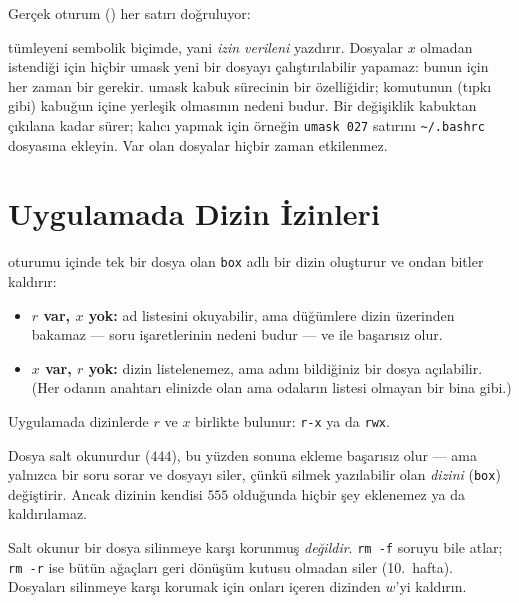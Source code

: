 Gerçek oturum () her satırı doğruluyor:



 tümleyeni sembolik biçimde, yani \emph{izin verileni} yazdırır. Dosyalar $x$ olmadan istendiği için hiçbir umask yeni bir dosyayı çalıştırılabilir yapamaz: bunun için her zaman bir  gerekir. umask kabuk sürecinin bir özelliğidir;  komutunun (tıpkı  gibi) kabuğun içine yerleşik olmasının nedeni budur. Bir değişiklik kabuktan çıkılana kadar sürer; kalıcı yapmak için örneğin \texttt{umask 027} satırını \texttt{\textasciitilde/.bashrc} dosyasına ekleyin. Var olan dosyalar hiçbir zaman etkilenmez.

\section{Uygulamada Dizin İzinleri}
\label{sec:dirs}

 oturumu içinde tek bir dosya olan \texttt{box} adlı bir dizin oluşturur ve ondan bitler kaldırır:



\begin{itemize}
  \item \textbf{$r$ var, $x$ yok:}  ad listesini okuyabilir, ama  düğümlere dizin üzerinden bakamaz --- soru işaretlerinin nedeni budur --- ve  ile  başarısız olur.
  \item \textbf{$x$ var, $r$ yok:} dizin listelenemez, ama adını bildiğiniz bir dosya açılabilir. (Her odanın anahtarı elinizde olan ama odaların listesi olmayan bir bina gibi.)
\end{itemize}
Uygulamada dizinlerde $r$ ve $x$ birlikte bulunur: \texttt{r-x} ya da \texttt{rwx}.



Dosya salt okunurdur ($444$), bu yüzden sonuna ekleme başarısız olur --- ama  yalnızca bir soru sorar ve dosyayı siler, çünkü silmek yazılabilir olan \emph{dizini} (\texttt{box}) değiştirir. Ancak dizinin kendisi $555$ olduğunda hiçbir şey eklenemez ya da kaldırılamaz.

\begin{keyidea}
Salt okunur bir dosya silinmeye karşı korunmuş \emph{değildir}. \texttt{rm -f} soruyu bile atlar; \texttt{rm -r} ise bütün ağaçları geri dönüşüm kutusu olmadan siler (10.~hafta). Dosyaları silinmeye karşı korumak için onları içeren dizinden $w$'yi kaldırın.
\end{keyidea}

